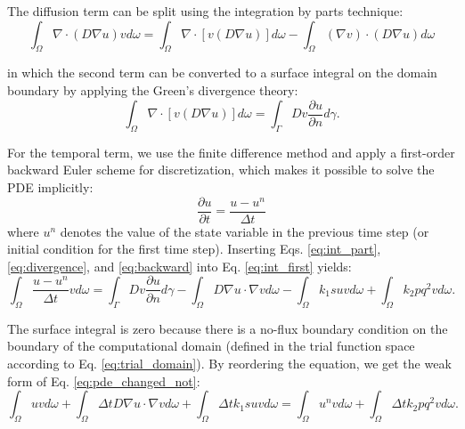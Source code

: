 \noindent The diffusion term can be split using the integration by parts technique:
\begin{equation} \label{eq:int_part}
\int_{\Omega} \nabla \cdot (D  \nabla u) v d \omega = \int_{\Omega} \nabla \cdot[v(D  \nabla u)] d \omega-\int_{\Omega} (\nabla v) \cdot(D  \nabla u) d \omega
\end{equation}

\noindent in which the second term can be converted to a surface integral on the domain boundary by applying the Green's divergence theory:
\begin{equation} \label{eq:divergence}
\int_{\Omega} \nabla \cdot[v(D  \nabla u)] d \omega = \int_{\Gamma} D v \frac{\partial u}{\partial n} d \gamma.
\end{equation}

\noindent For the temporal term, we use the finite difference method and apply a first-order backward Euler scheme for discretization, which makes it possible to solve the \gls{PDE} implicitly:
\begin{equation} \label{eq:backward}
\frac{\partial u}{\partial t} = \frac{u-u^{n}}{\Delta t}
\end{equation}
\noindent where $u^n$ denotes the value of the state variable in the previous time step (or initial condition for the first time step). Inserting Eqs. \ref{eq:int_part}, \ref{eq:divergence}, and \ref{eq:backward} into Eq. \ref{eq:int_first} yields:
\begin{equation}
\int_{\Omega} \frac{u-u^{n}}{\Delta t} v d \omega=\int_{\Gamma} D v  \frac{\partial u}{\partial n} d \gamma-\int_{\Omega} D  \nabla u \cdot \nabla v d \omega-\int_{\Omega} k_{1} s u v d \omega+\int_{\Omega} k_{2} p q^{2} v d \omega.
\end{equation}

\noindent The surface integral is zero because there is a no-flux boundary condition on the boundary of the computational domain (defined in the trial function space according to Eq. \ref{eq:trial_domain}). By reordering the equation, we get the weak form of Eq. \ref{eq:pde_changed_not}:
\begin{equation}  \label{eq:weak_general}
\int_{\Omega} {u} v d \omega+\int_{\Omega} \Delta t D  \nabla u \cdot  \nabla v d \omega+\int_{\Omega} \Delta tk_{1} s u v d \omega=\int_{\Omega} {u^{n}} v d \omega+\int_{\Omega} \Delta t k_{2} p q^{2} v d \omega.
\end{equation}


